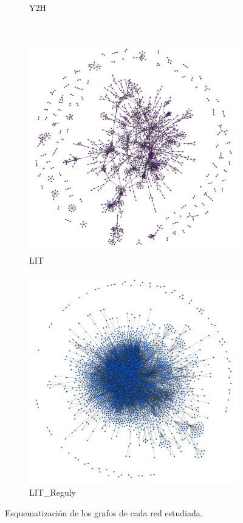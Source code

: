 \begin{figure}[!ht]
\begin{subfigure}[b]{0.4\columnwidth}
        \caption{\label{fig:y2h} Y2H}
    \end{subfigure}
    \\
    \begin{subfigure}[b]{0.4\columnwidth}
        \includegraphics[width=\textwidth]{./schemes/yeast_LIT-txt.pdf}
        \caption{\label{fig:LIT}LIT}
    \end{subfigure}
    \begin{subfigure}[b]{0.4\columnwidth}
        \includegraphics[width=\textwidth]{./schemes/yeast_LIT_Reguly-gml.pdf}
        \caption{\label{fig:LITR}LIT\_Reguly}
    \end{subfigure}
    \caption{\label{grafos} Esquematizaci\'on de los grafos de cada 
    red estudiada.}
\end{figure}


